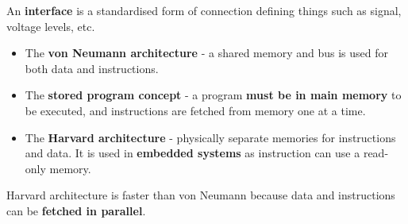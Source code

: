 An \textbf{interface} is a standardised form of connection defining things such as signal, voltage levels, etc.

\begin{itemize}
    \item The \textbf{von Neumann architecture} - a shared memory and bus is used for both data and instructions.
    \item The \textbf{stored program concept} - a program \textbf{must be in main memory} to be executed, and instructions are fetched from memory one at a time.
    \item The \textbf{Harvard architecture} - physically separate memories for instructions and data. It is used in \textbf{embedded systems} as instruction can use a read-only memory.
\end{itemize}

Harvard architecture is faster than von Neumann because data and instructions can be \textbf{fetched in parallel}.

